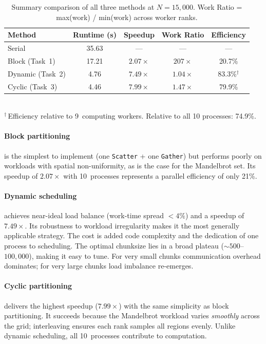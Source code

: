 \documentclass[11pt,a4paper]{article}
\begin{document}
\begin{table}[h]\centering
\begin{tabular}{@{}lcccc@{}}
\toprule
Method & Runtime (s) & Speedup & Work Ratio & Efficiency \\
\midrule
Serial               & 35.63 & ---           & ---           & --- \\
Block (Task~1)       & 17.21 & $2.07\times$  & $207\times$   & 20.7\% \\
Dynamic (Task~2)     &  4.76 & $7.49\times$  & $1.04\times$  & 83.3\%$^\dagger$ \\
Cyclic (Task~3)      &  4.46 & $7.99\times$  & $1.47\times$  & 79.9\% \\
\bottomrule
\end{tabular}\\[4pt]
{\footnotesize $^\dagger$\,Efficiency relative to 9~computing workers.
Relative to all 10 processes: 74.9\%.}
\caption{Summary comparison of all three methods at $N = 15{,}000$.
Work Ratio = max(work) / min(work) across worker ranks.}
\label{tab:summary}
\end{table}

\paragraph{Block partitioning} is the simplest to implement (one
\texttt{Scatter} + one \texttt{Gather}) but performs poorly on workloads
with spatial non-uniformity, as is the case for the Mandelbrot set. Its
speedup of $2.07\times$ with 10~processes represents a parallel efficiency
of only 21\%.

\paragraph{Dynamic scheduling} achieves near-ideal load balance (work-time
spread $< 4\%$) and a speedup of $7.49\times$. Its robustness to workload
irregularity makes it the most generally applicable strategy. The cost is
added code complexity and the dedication of one process to scheduling. The
optimal chunksize lies in a broad plateau ($\sim 500$--$100{,}000$), making
it easy to tune. For very small chunks communication overhead dominates; for
very large chunks load imbalance re-emerges.

\paragraph{Cyclic partitioning} delivers the highest speedup
($7.99\times$) with the same simplicity as block partitioning. It succeeds
because the Mandelbrot workload varies \emph{smoothly} across the grid;
interleaving ensures each rank samples all regions evenly. Unlike dynamic
scheduling, all 10~processes contribute to computation.
\end{document}
